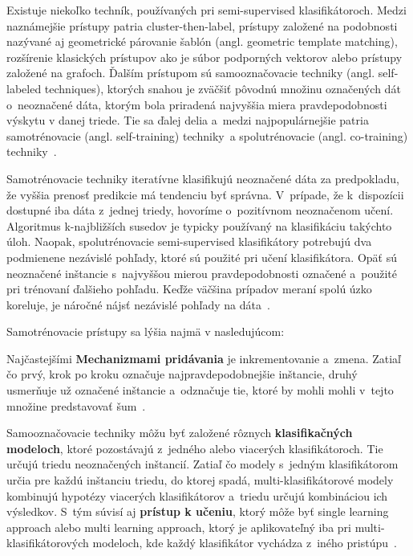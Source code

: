 \documentclass[a4paper,twoside,slovak,12pt]{article}
\begin{document}
Existuje niekoľko techník, používaných pri semi-supervised klasifikátoroch.
Medzi naznámejšie prístupy patria cluster-then-label, prístupy založené na
podobnosti nazývané aj geometrické párovanie šablón (angl. geometric template
matching), rozšírenie klasických prístupov ako je súbor podporných vektorov
alebo prístupy založené na grafoch. Ďalším prístupom sú samooznačovacie techniky
(angl. self-labeled techniques), ktorých snahou je zväčšiť pôvodnú množinu
označených dát o~neoznačené dáta, ktorým bola priradená najvyššia miera
pravdepodobnosti výskytu v danej triede. Tie sa ďalej delia a~medzi
najpopulárnejšie patria samotrénovacie (angl. self-training) techniky~a
spolutrénovacie (angl. co-training) techniky~\cite{Gonzalez2017}.

Samotrénovacie techniky iteratívne klasifikujú neoznačené dáta za predpokladu,
že vyššia prenosť predikcie má tendenciu byť správna. V~prípade, že k~dispozícii
dostupné iba dáta z~jednej triedy, hovoríme o~pozitívnom neoznačenom učení.
Algoritmus k-najbližších susedov je typicky používaný na klasifikáciu takýchto
úloh. Naopak, spolutrénovacie semi-supervised klasifikátory potrebujú dva
podmienene nezávislé pohľady, ktoré sú použité pri učení klasifikátora. Opäť sú
neoznačené inštancie s~najvyššou mierou pravdepodobnosti označené a~použité pri
trénovaní ďalšieho pohľadu. Keďže väčšina prípadov meraní spolú úzko koreluje,
je náročné nájsť nezávislé pohľady na dáta~\cite{Gonzalez2017}.

Samotrénovacie prístupy sa lýšia najmä v nasledujúcom:

Najčastejšími \textbf{Mechanizmami pridávania} je inkrementovanie a~zmena.
Zatiaľ čo prvý, krok po kroku označuje najpravdepodobnejšie inštancie, druhý
usmerňuje už označené inštancie a~odznačuje tie, ktoré by mohli mohli v~tejto
množine predstavovať šum~\cite{Gonzalez2017}.

Samooznačovacie techniky môžu byť založené rôznych
\textbf{klasifikačných modeloch}, ktoré pozostávajú z~jedného alebo viacerých
klasifikátoroch. Tie určujú triedu neoznačených inštancií. Zatiaľ čo modely
s~jedným klasifikátorom určia pre každú inštanciu triedu, do ktorej spadá,
multi-klasifikátorové modely kombinujú hypotézy viacerých klasifikátorov
a~triedu určujú kombináciou ich výsledkov. S~tým súvisí aj
\textbf{prístup k učeniu}, ktorý môže byť single learning approach alebo
multi learning approach, ktorý je aplikovateľný iba pri multi-klasifikátorových
modeloch, kde každý klasifikátor vychádza z~iného pristúpu~\cite{Gonzalez2017}.
\end{document}
